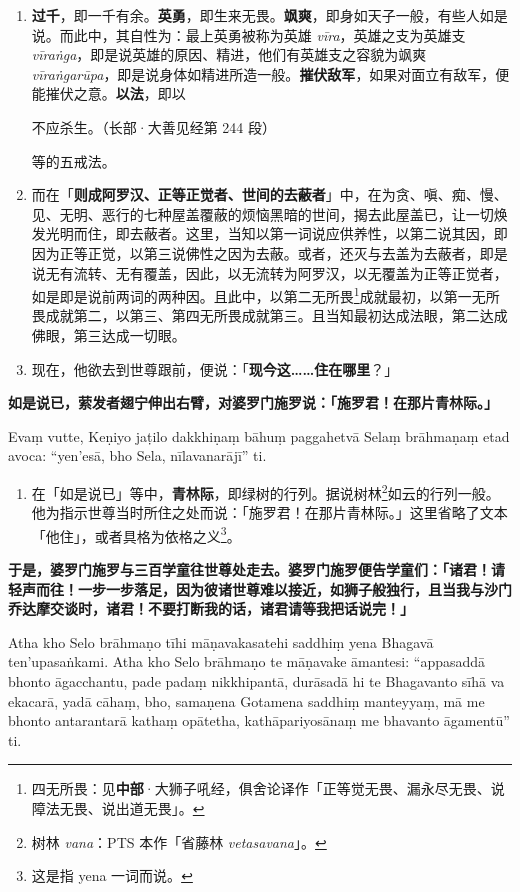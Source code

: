 \begin{enumerate}
\item \textbf{过千}，即一千有余。\textbf{英勇}，即生来无畏。\textbf{飒爽}，即身如天子一般，有些人如是说。而此中，其自性为：最上英勇被称为英雄 \textit{vīra}，英雄之支为英雄支 \textit{vīraṅga}，即是说英雄的原因、精进，他们有英雄支之容貌为飒爽 \textit{vīraṅgarūpa}，即是说身体如精进所造一般。\textbf{摧伏敌军}，如果对面立有敌军，便能摧伏之意。\textbf{以法}，即以\begin{quoting}不应杀生。（长部·大善见经第 244 段）\end{quoting}等的五戒法。
\item 而在「\textbf{则成阿罗汉、正等正觉者、世间的去蔽者}」中，在为贪、嗔、痴、慢、见、无明、恶行的七种屋盖覆蔽的烦恼黑暗的世间，揭去此屋盖已，让一切焕发光明而住，即去蔽者。这里，当知以第一词说应供养性，以第二说其因，即因为正等正觉，以第三说佛性之因为去蔽。或者，还灭与去盖为去蔽者，即是说无有流转、无有覆盖，因此，以无流转为阿罗汉，以无覆盖为正等正觉者，如是即是说前两词的两种因。且此中，以第二无所畏\footnote{四无所畏：见\textbf{中部}·大狮子吼经，俱舍论译作「正等觉无畏、漏永尽无畏、说障法无畏、说出道无畏」。}成就最初，以第一无所畏成就第二，以第三、第四无所畏成就第三。且当知最初达成法眼，第二达成佛眼，第三达成一切眼。
\item 现在，他欲去到世尊跟前，便说：「\textbf{现今这……住在哪里}？」\end{enumerate}

\textbf{如是说已，萦发者翅宁伸出右臂，对婆罗门施罗说：「施罗君！在那片青林际。」}

Evaṃ vutte, Keṇiyo jaṭilo dakkhiṇaṃ bāhuṃ paggahetvā Selaṃ brāhmaṇaṃ etad avoca: “yen’esā, bho Sela, nīlavanarājī” ti.

\begin{enumerate}\item 在「如是说已」等中，\textbf{青林际}，即绿树的行列。据说树林\footnote{树林 \textit{vana}：PTS 本作「省藤林 \textit{vetasavana}」。}如云的行列一般。他为指示世尊当时所住之处而说：「施罗君！在那片青林际。」这里省略了文本「他住」，或者具格为依格之义\footnote{这是指 yena 一词而说。}。\end{enumerate}

\textbf{于是，婆罗门施罗与三百学童往世尊处走去。婆罗门施罗便告学童们：「诸君！请轻声而往！一步一步落足，因为彼诸世尊难以接近，如狮子般独行，且当我与沙门乔达摩交谈时，诸君！不要打断我的话，诸君请等我把话说完！」}

Atha kho Selo brāhmaṇo tīhi māṇavakasatehi saddhiṃ yena Bhagavā ten’upasaṅkami. Atha kho Selo brāhmaṇo te māṇavake āmantesi: “appasaddā bhonto āgacchantu, pade padaṃ nikkhipantā, durāsadā hi te Bhagavanto sīhā va ekacarā, yadā cāhaṃ, bho, samaṇena Gotamena saddhiṃ manteyyaṃ, mā me bhonto antarantarā kathaṃ opātetha, kathāpariyosānaṃ me bhavanto āgamentū” ti.

